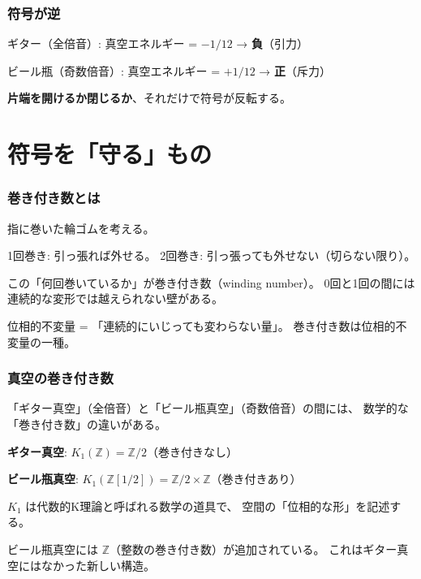 \documentclass[12pt,a4paper]{article}
\begin{document}
\section{符号が逆}

\begin{resultbox}[核心]
ギター（全倍音）: 真空エネルギー = $-1/12$ → \textbf{負}（引力）

ビール瓶（奇数倍音）: 真空エネルギー = $+1/12$ → \textbf{正}（斥力）

\textbf{片端を開けるか閉じるか}、それだけで符号が反転する。
\end{resultbox}

\part{符号を「守る」もの}

\section{巻き付き数とは}

\begin{storybox}[輪ゴムの話]
指に巻いた輪ゴムを考える。

1回巻き: 引っ張れば外せる。
2回巻き: 引っ張っても外せない（切らない限り）。

この「何回巻いているか」が巻き付き数（winding number）。
0回と1回の間には連続的な変形では越えられない壁がある。

位相的不変量 = 「連続的にいじっても変わらない量」。
巻き付き数は位相的不変量の一種。
\end{storybox}

\section{真空の巻き付き数}

\begin{mathbox}[K理論]
「ギター真空」（全倍音）と「ビール瓶真空」（奇数倍音）の間には、
数学的な「巻き付き数」の違いがある。

\textbf{ギター真空}: $K_1(\mathbb{Z}) = \mathbb{Z}/2$（巻き付きなし）

\textbf{ビール瓶真空}: $K_1(\mathbb{Z}[1/2]) = \mathbb{Z}/2 \times \mathbb{Z}$（巻き付きあり）

$K_1$ は代数的K理論と呼ばれる数学の道具で、
空間の「位相的な形」を記述する。

ビール瓶真空には $\mathbb{Z}$（整数の巻き付き数）が追加されている。
これはギター真空にはなかった新しい構造。
\end{mathbox}
\end{document}
